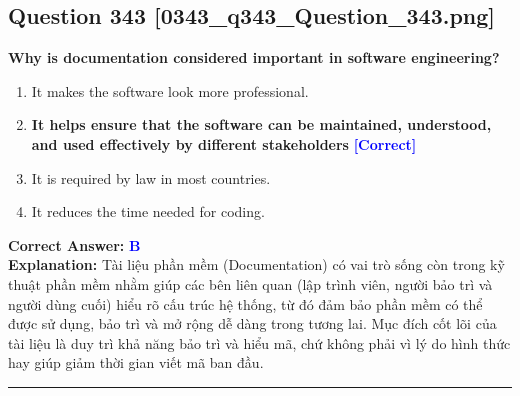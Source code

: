 \documentclass[11pt,a4paper]{article}
\begin{document}
\begin{minipage}{\textwidth}
\subsection*{Question 343 \quad \footnotesize{[0343\_q343\_Question\_343.png]}}
\noindent \textbf{Why is documentation considered important in software engineering?}

\begin{enumerate}[label=\Alph*.]
    \item It makes the software look more professional.
    \item \textbf{It helps ensure that the software can be maintained, understood, and used effectively by different stakeholders} \hfill \textcolor{blue}{\textbf{[Correct]}}
    \item It is required by law in most countries.
    \item It reduces the time needed for coding.
\end{enumerate}

\noindent \textbf{Correct Answer:} \textcolor{blue}{\textbf{B}} \\[2pt]
\noindent \textbf{Explanation:} Tài liệu phần mềm (Documentation) có vai trò sống còn trong kỹ thuật phần mềm nhằm giúp các bên liên quan (lập trình viên, người bảo trì và người dùng cuối) hiểu rõ cấu trúc hệ thống, từ đó đảm bảo phần mềm có thể được sử dụng, bảo trì và mở rộng dễ dàng trong tương lai. Mục đích cốt lõi của tài liệu là duy trì khả năng bảo trì và hiểu mã, chứ không phải vì lý do hình thức hay giúp giảm thời gian viết mã ban đầu.

\par\vspace{0.3cm}
\hrule
\vspace{0.3cm}
\end{minipage}
\end{document}
